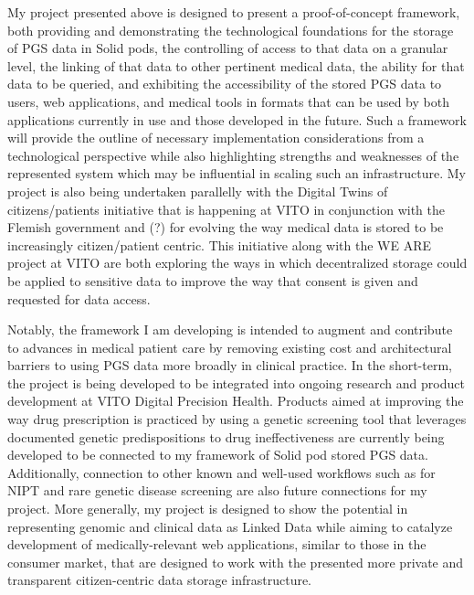 \documentclass[runningheads]{llncs}
\begin{document}
My project presented above is designed to present a proof-of-concept framework, both providing and demonstrating the technological foundations for the storage of PGS data in Solid pods, the controlling of access to that data on a granular level, the linking of that data to other pertinent medical data, the ability for that data to be queried, and exhibiting the accessibility of the stored PGS data to users, web applications, and medical tools in formats that can be used by both applications currently in use and those developed in the future. 
Such a framework will provide the outline of necessary implementation considerations from a technological perspective while also highlighting strengths and weaknesses of the represented system which may be influential in scaling such an infrastructure. 
My project is also being undertaken parallelly with the Digital Twins of citizens/patients initiative that is happening at VITO in conjunction with the Flemish government and (?) for evolving the way medical data is stored to be increasingly citizen/patient centric. 
This initiative along with the WE ARE project at VITO are both exploring the ways in which decentralized storage could be applied to sensitive data to improve the way that consent is given and requested for data access. 

Notably, the framework I am developing is intended to augment and contribute to advances in medical patient care by removing existing cost and architectural barriers to using PGS data more broadly in clinical practice. 
In the short-term, the project is being developed to be integrated into ongoing research and product development at VITO Digital Precision Health. 
Products aimed at improving the way drug prescription is practiced by using a genetic screening tool that leverages documented genetic predispositions to drug ineffectiveness are currently being developed to be connected to my framework of Solid pod stored PGS data. 
Additionally, connection to other known and well-used workflows such as for NIPT and rare genetic disease screening are also future connections for my project. 
More generally, my project is designed to show the potential in representing genomic and clinical data as Linked Data while aiming to catalyze  development of medically-relevant web applications, similar to those in the consumer market, that are designed to work with the presented more private and transparent citizen-centric data storage infrastructure.
\end{document}
